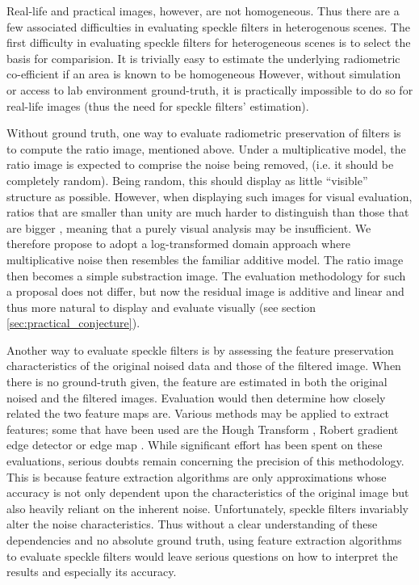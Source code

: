 \documentclass[journal]{IEEEtran}
\begin{document}
Real-life and practical images, however, are not homogeneous.
Thus there are a few associated difficulties in evaluating speckle filters in heterogenous scenes.
The first difficulty in evaluating speckle filters for heterogeneous scenes is to select the basis for comparision. 
It is trivially easy to estimate the underlying radiometric co-efficient if an area is known to be homogeneous
However, without simulation or access to lab environment ground-truth, it is practically impossible to do so for real-life images (thus the need for speckle filters' estimation).

Without ground truth, one way to evaluate radiometric preservation of filters is to compute the ratio image, mentioned above. 
Under a multiplicative model, the ratio image is expected to comprise the noise being removed, (i.e. it should be completely random). 
Being random, this should display as little ``visible'' structure as possible. 
However, when displaying such images for visual evaluation, ratios that are smaller than unity are much harder to distinguish than those that are bigger \cite{Medeiros_2003_IJRS}, meaning that a purely visual analysis may be insufficient.
We therefore propose to adopt a log-transformed domain approach where multiplicative noise then resembles the familiar additive model.
The ratio image then becomes a simple substraction image.
The evaluation methodology for such a proposal does not differ, but now the residual image is additive and linear and thus more natural to display and evaluate visually (see section \ref{sec:practical_conjecture}).

Another way to evaluate speckle filters is by assessing the feature preservation characteristics of the original noised data and those of the filtered image. 
When there is no ground-truth given, the feature are estimated in both the original noised and the filtered images.
Evaluation would then determine how closely related the two feature maps are. 
Various methods may be applied to extract features; some that have been used are the Hough Transform \cite{Medeiros_2003_IJRS}, Robert gradient edge detector \cite{Gagnon_SPIEProc_1997} or edge map \cite{Frost_PAMI_1982}.
While significant effort has been spent on these evaluations, serious doubts remain concerning the precision of this methodology.
This is because feature extraction algorithms are only approximations 
	whose accuracy is 
		not only dependent upon the characteristics of the original image 
		but also heavily reliant on the inherent noise.
Unfortunately, speckle filters invariably alter the noise characteristics.
Thus without a clear understanding of these dependencies and no absolute ground truth, 
	using feature extraction algorithms to evaluate speckle filters would leave serious questions on how to interpret the results and especially its accuracy.
\end{document}
